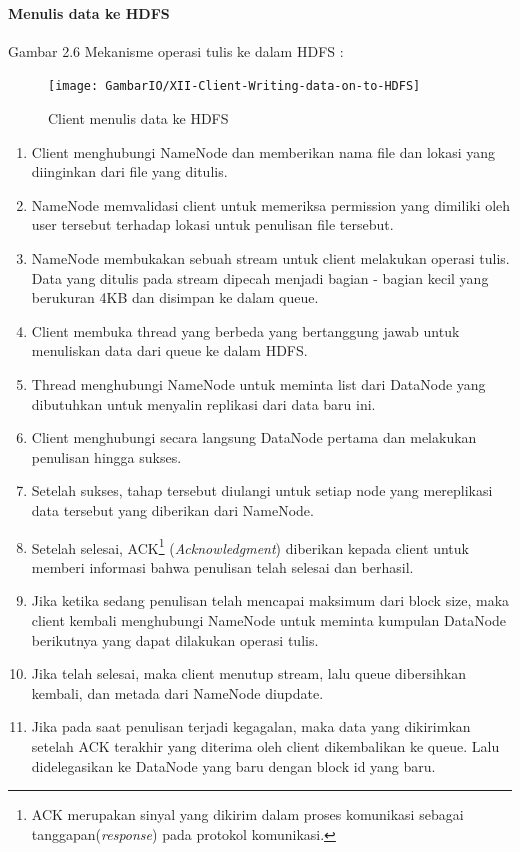		\paragraph{Menulis data ke HDFS}
		Gambar 2.6
		Mekanisme operasi tulis ke dalam HDFS :
		
		\begin{figure}[ht]
			\centering
			\texttt{[image: GambarIO/XII-Client-Writing-data-on-to-HDFS]}
			\caption[Client menulis data ke HDFS]{Client menulis data ke HDFS}
			\label{fig:XII-Client-Writing-data-on-to-HDFS}
		\end{figure}
			
			
		\begin{enumerate}
			\item Client menghubungi NameNode dan memberikan nama file dan lokasi yang diinginkan dari file yang ditulis.
			\item NameNode memvalidasi client untuk memeriksa permission yang dimiliki oleh user tersebut terhadap lokasi untuk penulisan file tersebut.
			\item NameNode membukakan sebuah stream untuk client melakukan operasi tulis. Data yang ditulis pada stream dipecah menjadi bagian - bagian kecil yang berukuran 4KB dan disimpan ke dalam queue.
			\item Client membuka thread yang berbeda yang bertanggung jawab untuk menuliskan data dari queue ke dalam HDFS.
			\item Thread menghubungi NameNode untuk meminta list dari DataNode yang dibutuhkan untuk menyalin replikasi dari data baru ini.
			\item Client menghubungi secara langsung DataNode pertama dan melakukan penulisan hingga sukses.
			\item Setelah sukses, tahap tersebut diulangi untuk setiap node yang mereplikasi data tersebut yang diberikan dari NameNode.
			\item Setelah selesai, ACK\footnote{ACK merupakan sinyal yang dikirim dalam proses komunikasi sebagai tanggapan(\textit{response}) pada protokol komunikasi.} (\textit{Acknowledgment}) diberikan kepada client untuk memberi informasi bahwa penulisan telah selesai dan berhasil.
			\item Jika ketika sedang penulisan telah mencapai maksimum dari block size, maka client kembali menghubungi NameNode untuk meminta kumpulan DataNode berikutnya yang dapat dilakukan operasi tulis.
			\item Jika telah selesai, maka client menutup stream, lalu queue dibersihkan kembali, dan metada dari NameNode diupdate.
			\item Jika pada saat penulisan terjadi kegagalan, maka data yang dikirimkan setelah ACK terakhir yang diterima oleh client dikembalikan ke queue. Lalu didelegasikan ke DataNode yang baru dengan block id yang baru.
		\end{enumerate}
		
